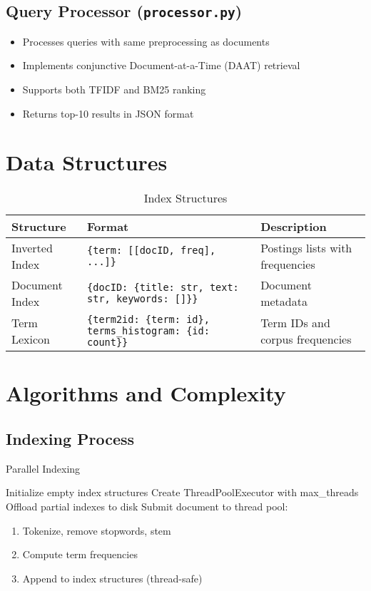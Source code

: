 \subsection{Query Processor (\texttt{processor.py})}
\begin{itemize}
  \item Processes queries with same preprocessing as documents
  \item Implements conjunctive Document-at-a-Time (DAAT) retrieval
  \item Supports both TFIDF and BM25 ranking
  \item Returns top-10 results in JSON format
\end{itemize}

\section{Data Structures}
\begin{table}[htbp]
  \caption{Index Structures}
  \label{tab:index-structures}
  \begin{tabular}{lll}
    \toprule
    \textbf{Structure} & \textbf{Format}                                                     & \textbf{Description}            \\
    \midrule
    Inverted Index     & \texttt{\{term: [[docID, freq], ...]\}}                             & Postings lists with frequencies \\
    Document Index     & \texttt{\{docID: \{title: str, text: str, keywords: []\}\}}         & Document metadata               \\
    Term Lexicon       & \texttt{\{term2id: \{term: id\}, terms\_histogram: \{id: count\}\}} & Term IDs and corpus frequencies \\
    \bottomrule
  \end{tabular}
\end{table}

\section{Algorithms and Complexity}

\subsection{Indexing Process}
\begin{algorithm}[H]
  \caption{Parallel Indexing}
  \begin{algorithmic}
    \STATE Initialize empty index structures
    \STATE Create ThreadPoolExecutor with max\_threads
    \STATE Offload partial indexes to disk
    \ENDIF
    \STATE Submit document to thread pool:
    \begin{enumerate}
      \item Tokenize, remove stopwords, stem
      \item Compute term frequencies
      \item Append to index structures (thread-safe)
    \end{enumerate}
    \ENDFOR
  \end{algorithmic}
\end{algorithm}

